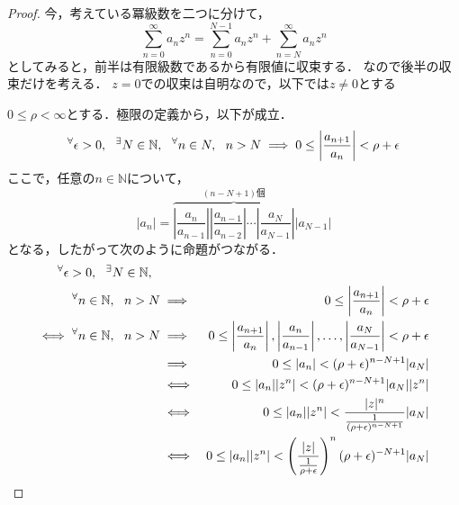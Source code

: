 \documentclass[a4paper]{jsarticle}
\begin{document}
        \begin{proof}
            今，考えている冪級数を二つに分けて，
            \[
                \sum_{n=0}^\infty{a_n z^n}=\sum_{n=0}^{N-1}{a_n z^n}+\sum_{n=N}^{\infty}{a_n z^n}
            \]
            としてみると，前半は有限級数であるから有限値に収束する．
            なので後半の収束だけを考える．
            $z=0$での収束は自明なので，以下では$z \neq 0$とする

            $0 \leq \rho < \infty$とする．極限の定義から，以下が成立．
            \[
                {}^{\forall} \epsilon>0,~~ {}^{\exists} N \in \mathbb{N},~~ {}^{\forall} n \in N,~~
                n>N \implies 0 \leq \left| \frac{a_{n+1}}{a_n} \right| < \rho + \epsilon
            \]
            ここで，任意の$n \in \mathbb{N}$について，
            \[
                |a_n|
                = \overbrace
                {
                    \left|\frac{a_{n}}{a_{n-1}}\right| \left|\frac{a_{n-1}}{a_{n-2}}\right| \cdots \left|\frac{a_{N}}{a_{N-1}}\right|
                }^{ (n-N+1)個 } |a_{N-1}|
            \]
            となる，したがって次のように命題がつながる．
            \begin{eqnarray*}
                {}^{\forall} \epsilon>0,~~ {}^{\exists} N \in \mathbb{N},~~ \\
                {}^{\forall} n \in \mathbb{N},~~ n>N &\implies& 0 \leq \left| \frac{a_{n+1}}{a_{n}} \right| < \rho + \epsilon \\
                \iff {}^{\forall} n \in \mathbb{N},~~ n>N &\implies&
                    0 \leq
                        \left| \frac{a_{n+1}}{a_{n}} \right|,
                        \left| \frac{a_{n}}{a_{n-1}} \right|,
                        \dots,
                        \left| \frac{a_{N}}{a_{N-1}} \right|
                    < \rho + \epsilon \\
                &\implies&  0 \leq |a_n|< (\rho+\epsilon)^{n-N+1}|a_N| \\
                &\iff&      0 \leq |a_n||z^n|< (\rho+\epsilon)^{n-N+1}|a_N| |z^n| \\
                &\iff&      0 \leq |a_n||z^n|< \frac{|z|^n}{\frac{1}{(\rho+\epsilon)^{n-N+1}}}|a_N| \\
                &\iff&      0 \leq |a_n||z^n|< \left( \frac{|z|}{\frac{1}{\rho+\epsilon}} \right)^{n} (\rho+\epsilon)^{-N+1} |a_N| \\
            \end{eqnarray*}


\end{proof}
\end{document}
